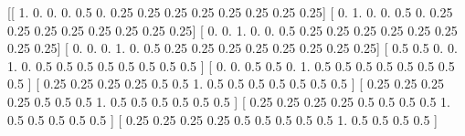 \documentclass[
  letterpaper,
  DIV=11,
  numbers=noendperiod]{scrreprt}
\newenvironment{Shaded}{\begin{snugshade}}{\end{snugshade}}
\newcommand{\FloatTok}[1]{\textcolor[rgb]{0.68,0.00,0.00}{#1}}
\newcommand{\NormalTok}[1]{\textcolor[rgb]{0.00,0.23,0.31}{#1}}
\begin{document}
\begin{Shaded}
\begin{Highlighting}[]
\NormalTok{[[ }\FloatTok{1.}   \FloatTok{0.}   \FloatTok{0.}   \FloatTok{0.}   \FloatTok{0.5}  \FloatTok{0.}   \FloatTok{0.25} \FloatTok{0.25} \FloatTok{0.25} \FloatTok{0.25} \FloatTok{0.25} \FloatTok{0.25} \FloatTok{0.25} \FloatTok{0.25}\NormalTok{]}
\NormalTok{ [ }\FloatTok{0.}   \FloatTok{1.}   \FloatTok{0.}   \FloatTok{0.}   \FloatTok{0.5}  \FloatTok{0.}   \FloatTok{0.25} \FloatTok{0.25} \FloatTok{0.25} \FloatTok{0.25} \FloatTok{0.25} \FloatTok{0.25} \FloatTok{0.25} \FloatTok{0.25}\NormalTok{]}
\NormalTok{ [ }\FloatTok{0.}   \FloatTok{0.}   \FloatTok{1.}   \FloatTok{0.}   \FloatTok{0.}   \FloatTok{0.5}  \FloatTok{0.25} \FloatTok{0.25} \FloatTok{0.25} \FloatTok{0.25} \FloatTok{0.25} \FloatTok{0.25} \FloatTok{0.25} \FloatTok{0.25}\NormalTok{]}
\NormalTok{ [ }\FloatTok{0.}   \FloatTok{0.}   \FloatTok{0.}   \FloatTok{1.}   \FloatTok{0.}   \FloatTok{0.5}  \FloatTok{0.25} \FloatTok{0.25} \FloatTok{0.25} \FloatTok{0.25} \FloatTok{0.25} \FloatTok{0.25} \FloatTok{0.25} \FloatTok{0.25}\NormalTok{]}
\NormalTok{ [ }\FloatTok{0.5}  \FloatTok{0.5}  \FloatTok{0.}   \FloatTok{0.}   \FloatTok{1.}   \FloatTok{0.}   \FloatTok{0.5}  \FloatTok{0.5}  \FloatTok{0.5}  \FloatTok{0.5}  \FloatTok{0.5}  \FloatTok{0.5}  \FloatTok{0.5}  \FloatTok{0.5}\NormalTok{ ]}
\NormalTok{ [ }\FloatTok{0.}   \FloatTok{0.}   \FloatTok{0.5}  \FloatTok{0.5}  \FloatTok{0.}   \FloatTok{1.}   \FloatTok{0.5}  \FloatTok{0.5}  \FloatTok{0.5}  \FloatTok{0.5}  \FloatTok{0.5}  \FloatTok{0.5}  \FloatTok{0.5}  \FloatTok{0.5}\NormalTok{ ]}
\NormalTok{ [ }\FloatTok{0.25} \FloatTok{0.25} \FloatTok{0.25} \FloatTok{0.25} \FloatTok{0.5}  \FloatTok{0.5}  \FloatTok{1.}   \FloatTok{0.5}  \FloatTok{0.5}  \FloatTok{0.5}  \FloatTok{0.5}  \FloatTok{0.5}  \FloatTok{0.5}  \FloatTok{0.5}\NormalTok{ ]}
\NormalTok{ [ }\FloatTok{0.25} \FloatTok{0.25} \FloatTok{0.25} \FloatTok{0.25} \FloatTok{0.5}  \FloatTok{0.5}  \FloatTok{0.5}  \FloatTok{1.}   \FloatTok{0.5}  \FloatTok{0.5}  \FloatTok{0.5}  \FloatTok{0.5}  \FloatTok{0.5}  \FloatTok{0.5}\NormalTok{ ]}
\NormalTok{ [ }\FloatTok{0.25} \FloatTok{0.25} \FloatTok{0.25} \FloatTok{0.25} \FloatTok{0.5}  \FloatTok{0.5}  \FloatTok{0.5}  \FloatTok{0.5}  \FloatTok{1.}   \FloatTok{0.5}  \FloatTok{0.5}  \FloatTok{0.5}  \FloatTok{0.5}  \FloatTok{0.5}\NormalTok{ ]}
\NormalTok{ [ }\FloatTok{0.25} \FloatTok{0.25} \FloatTok{0.25} \FloatTok{0.25} \FloatTok{0.5}  \FloatTok{0.5}  \FloatTok{0.5}  \FloatTok{0.5}  \FloatTok{0.5}  \FloatTok{1.}   \FloatTok{0.5}  \FloatTok{0.5}  \FloatTok{0.5}  \FloatTok{0.5}\NormalTok{ ]}

\end{Highlighting}
\end{Shaded}
\end{document}
